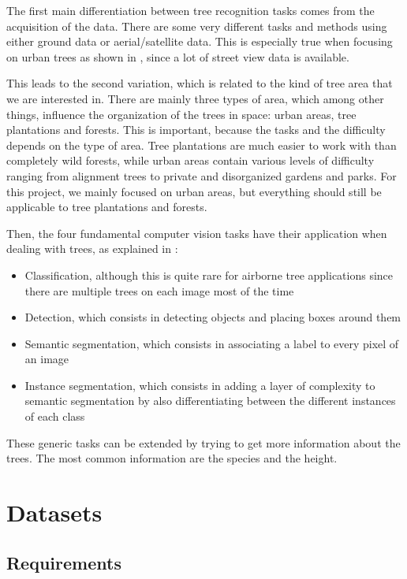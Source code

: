 \documentclass[
]{report}
\providecommand{\tightlist}{%
  \setlength{\itemsep}{0pt}\setlength{\parskip}{0pt}}\usepackage{longtable,booktabs,array}
\begin{document}
The first main differentiation between tree recognition tasks comes from
the acquisition of the data. There are some very different tasks and
methods using either ground data or aerial/satellite data. This is
especially true when focusing on urban trees as shown in
\textcite{urban-trees}, since a lot of street view data is available.

This leads to the second variation, which is related to the kind of tree
area that we are interested in. There are mainly three types of area,
which among other things, influence the organization of the trees in
space: urban areas, tree plantations and forests. This is important,
because the tasks and the difficulty depends on the type of area. Tree
plantations are much easier to work with than completely wild forests,
while urban areas contain various levels of difficulty ranging from
alignment trees to private and disorganized gardens and parks. For this
project, we mainly focused on urban areas, but everything should still
be applicable to tree plantations and forests.

Then, the four fundamental computer vision tasks have their application
when dealing with trees, as explained in \autocite{olive-tree}:

\begin{itemize}
\tightlist
\item
  Classification, although this is quite rare for airborne tree
  applications since there are multiple trees on each image most of the
  time
\item
  Detection, which consists in detecting objects and placing boxes
  around them
\item
  Semantic segmentation, which consists in associating a label to every
  pixel of an image
\item
  Instance segmentation, which consists in adding a layer of complexity
  to semantic segmentation by also differentiating between the different
  instances of each class
\end{itemize}

These generic tasks can be extended by trying to get more information
about the trees. The most common information are the species and the
height.

\section{Datasets}\label{datasets}

\subsection{Requirements}\label{requirements}
\end{document}
